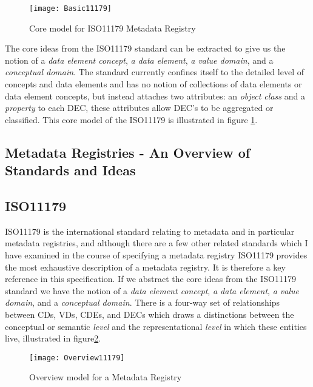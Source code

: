 \begin{figure}[here]
	\texttt{[image: Basic11179]}
	\caption{Core model for ISO11179 Metadata Registry} 
	\label{fig:basicMDR}
\end{figure}

The core ideas from the ISO11179 standard can be extracted to give us the notion of a \emph{data element concept}, \emph{a data element}, \emph{a value domain}, and a \emph{conceptual domain}. The standard currently confines itself to the detailed level of concepts and data elements and has no notion of collections of data elements or data element concepts, but instead attaches two attributes: an \emph{object class} and a \emph{property} to each DEC, these attributes allow DEC's to be aggregated or classified. This core model of the ISO11179 is illustrated in figure \ref{fig:basicMDR}.




\subsection{Metadata Registries - An Overview of Standards and Ideas}
\subsection{ISO11179}
ISO11179 is the international standard relating to metadata and in particular metadata registries, and although there are a few other related standards which I have examined in the course of specifying a metadata registry ISO11179 provides the most exhaustive description of a metadata registry. It is therefore a key reference in this specification. If we abstract the core ideas from the ISO11179 standard we have the notion of a \emph{data element concept}, \emph{a data element}, \emph{a value domain}, and a \emph{conceptual domain}. There is a four-way set of relationships between CDs, VDs, CDEs, and DECs which draws a distinctions between the conceptual or semantic \emph{level} and the representational \emph{level} in which these entities live, illustrated in figure\ref{fig:overviewMDR}.


\begin{figure}[here]
	\texttt{[image: Overview11179]}
	\caption{Overview model for a Metadata Registry} 
	\label{fig:overviewMDR}
\end{figure}

